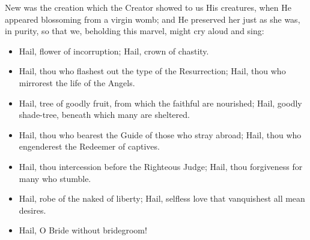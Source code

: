 \documentclass[twoside, letterpaper, 12pt]{report}
\begin{document}


\begin{reader}
  \item New was the creation which the Creator showed to us His creatures,
  when He appeared blossoming from a virgin womb;
  and He preserved her just as she was, in purity,
  so that we, beholding this marvel, might cry aloud and sing:
\end{reader}

\begin{itemize}[label=\tiny{+},leftmargin=*]
\item Hail, flower of incorruption;
      Hail, crown of chastity.
\item Hail, thou who flashest out the type of the Resurrection;
      Hail, thou who mirrorest the life of the Angels.
\item Hail, tree of goodly fruit, from which the faithful are nourished;
      Hail, goodly shade-tree, beneath which many are sheltered.
\item Hail, thou who bearest the Guide of those who stray abroad;
      Hail, thou who engenderest the Redeemer of captives.
\item Hail, thou intercession before the Righteous Judge;
      Hail, thou forgiveness for many who stumble.
\item Hail, robe of the naked of liberty;
      Hail, selfless love that vanquishest all mean desires.
\item Hail, O Bride without bridegroom!
\end{itemize}




\end{document}
